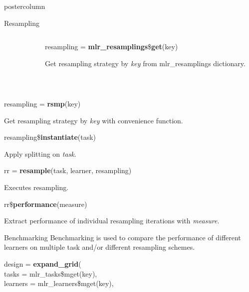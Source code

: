 \documentclass{beamer}
\begin{document}
\begin{frame}[fragile]{}
\begin{columns}
\begin{column}{.245\textwidth}
\begin{beamercolorbox}[center]{postercolumn}
\begin{minipage}{.98\textwidth}
{\begin{myblock}{Resampling}
\begin{minipage}{\textwidth}
\begin{columns}[T]
\begin{column}{0.2\textwidth}
									\end{column}
									\begin{column}{0.01\textwidth}
									\end{column}
									\begin{column}{0.79\textwidth}
										\begin{codebox}
											resampling = \textbf{mlr\_resamplings}\$\textbf{get}(key)
										\end{codebox}
										Get resampling strategy by \textit{key} from mlr\_resamplings dictionary.
									\end{column}
								\end{columns}
							\end{minipage}
							\\[\baselineskip]
							\begin{codebox}
								resampling = \textbf{rsmp}(key)
							\end{codebox}
							Get resampling strategy by \textit{key} with convenience function.
							\\
							\begin{codebox}
								resampling\$\textbf{instantiate}(task)
							\end{codebox}
							Apply splitting on \textit{task}.
							\\
							\begin{codebox}
								rr = \textbf{resample}(task, learner, resampling)
							\end{codebox}
							Executes resampling.
							\\
							\begin{codebox}
								rr\$\textbf{performance}(measure)
							\end{codebox}
							Extract performance of individual resampling iterations with \textit{measure}.
						\end{myblock}
						\begin{myblock}{Benchmarking}
							Benchmarking is used to compare the performance of different learners on multiple task and/or different resampling schemes.
							\\
							\begin{codeboxmultiline}[width=21.95cm]
								design = \textbf{expand\_grid}(\\
								\hspace*{1ex}tasks = mlr\_tasks\$mget(key),\\
								\hspace*{1ex}learners = mlr\_learners\$mget(key),\\

\end{codeboxmultiline}
\end{myblock}}
\end{minipage}
\end{beamercolorbox}
\end{column}
\end{columns}
\end{frame}
\end{document}
